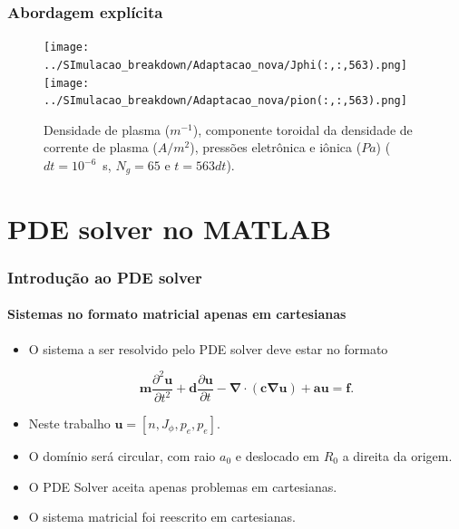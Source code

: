 \documentclass[aspectratio=169]{beamer}
\begin{document}
	\begin{frame}
		\frametitle{Abordagem explícita}


\begin{figure}[H]
\centering
\texttt{[image: ../SImulacao\_breakdown/Adaptacao\_nova/Jphi(:,:,563).png]} 
\texttt{[image: ../SImulacao\_breakdown/Adaptacao\_nova/pion(:,:,563).png]}  
\caption{Densidade de plasma ($m^{-1}$), componente toroidal da densidade de corrente de plasma ($A/m^2$), pressões eletrônica e iônica ($Pa$) ($dt=10^{-6}$\ s, $N_g = 65$ e $t=563dt$).}
\label{fig:simul26} 
\end{figure}	
	
	\end{frame}

\section{PDE solver no MATLAB}
\begin{frame}
\frametitle{Introdução ao PDE solver}
\framesubtitle{Sistemas no formato matricial apenas em cartesianas}
\begin{itemize}
\item O sistema a ser resolvido pelo PDE solver deve estar no formato 

\begin{equation}
\bm{m} \frac{\partial^2 \bm{u}}{\partial t^2} + \bm{d} \frac{\partial \bm{u}}{\partial t} - \bm{\nabla} \cdot \left( \bm{c} \bm{\nabla} \bm{u} \right) + \bm{a}\bm{u} = \bm{f}.
\label{sistemapde}
\end{equation} 
\item Neste trabalho $\bm{u}=[n, J_\phi, p_e, p_e]$.
\item O domínio será circular, com raio $a_0$ e deslocado em $R_0$ a direita da origem. 
\item O PDE Solver aceita apenas problemas em cartesianas. 
\item O sistema matricial foi reescrito em  cartesianas.
\end{itemize}
\end{frame}
\end{document}
